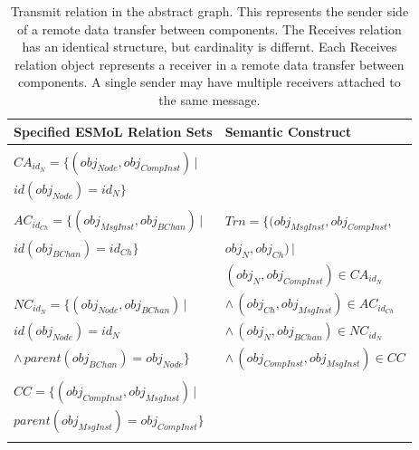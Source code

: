 \begin{table}[h]
\centering

\begin{tabular}[width=\columnwidth]{ | l | l | }
 \hline
 \textbf{Specified ESMoL Relation Sets} & \textbf{Semantic
Construct} \\
 \hline \hline
                                                                        & \\
 $CA_{id_N} = \{ (obj_{Node}, obj_{CompInst} ) \, |$                    & \\
 \hspace{1.7cm} $ id(obj_{Node}) = id_N \} $                            & \\
                                                                        & \\
 $AC_{id_{Ch}} = \{ (obj_{MsgInst}, obj_{BChan} ) \, |$          
   & 
$ Trn = \{(obj_{MsgInst}, obj_{CompInst}, $  \\
 \hspace{1.6cm} $id(obj_{BChan}) = id_{Ch} \} $                         & 
\hspace{1.3cm} $obj_{N}, obj_{Ch}) \, |$ \\
                                                                        &  
\hspace{0.8cm} $(obj_{N}, obj_{CompInst}) \in CA_{id_N}$ \\
 $NC_{id_N} = \{ (obj_{Node}, obj_{BChan}) \, | $                       & 
\hspace{0.5cm} $ \wedge \, (obj_{Ch}, obj_{MsgInst}) \in AC_{id_{Ch}}$ \\
 \hspace{1.35cm} $id(obj_{Node}) = id_N $                               &
\hspace{0.5cm} $ \wedge \, (obj_{N}, obj_{BChan}) \in NC_{id_N}$ \\ 
 \hspace{1cm} $ \wedge \, parent(obj_{BChan} ) = obj_{Node} \}$         &
\hspace{0.5cm} $ \wedge \, (obj_{CompInst}, obj_{MsgInst}) \in CC $ \\
                                                                        & \\
 $CC = \{ (obj_{CompInst}, obj_{MsgInst} ) \, | $                       & \\
 \hspace{0.7cm} $parent(obj_{MsgInst} ) = obj_{CompInst} \}$            & \\ 
                                                                        & \\
 \hline
\end{tabular}
	\caption{Transmit relation in the abstract graph.  This represents the
sender side of a remote data transfer between components. The Receives relation 
has an identical structure, but cardinality is differnt. Each Receives
relation object represents a receiver in a remote data transfer between
components. A single sender may have multiple receivers attached to the same
message.}
	\label{tab:transmit}
\end{table}

